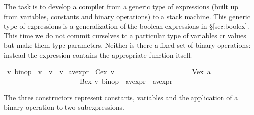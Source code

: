 %
\begin{isabellebody}%
%
%
\begin{isamarkuptext}%
\label{sec:ExprCompiler}
The task is to develop a compiler from a generic type of expressions (built
up from variables, constants and binary operations) to a stack machine.  This
generic type of expressions is a generalization of the boolean expressions in
\S\ref{sec:boolex}.  This time we do not commit ourselves to a particular
type of variables or values but make them type parameters.  Neither is there
a fixed set of binary operations: instead the expression contains the
appropriate function itself.%
\end{isamarkuptext}%
\ {\isacharprime}v\ binop\ {\isacharequal}\ {\isachardoublequote}{\isacharprime}v\ {\isasymRightarrow}\ {\isacharprime}v\ {\isasymRightarrow}\ {\isacharprime}v{\isachardoublequote}\isanewline
{}\ {\isacharparenleft}{\isacharprime}a{\isacharcomma}{\isacharprime}v{\isacharparenright}expr\ {\isacharequal}\ Cex\ {\isacharprime}v\isanewline
\ \ \ \ \ \ \ \ \ \ \ \ \ \ \ \ \ \ \ \ \ {\isacharbar}\ Vex\ {\isacharprime}a\isanewline
\ \ \ \ \ \ \ \ \ \ \ \ \ \ \ \ \ \ \ \ \ {\isacharbar}\ Bex\ {\isachardoublequote}{\isacharprime}v\ binop{\isachardoublequote}\ \ {\isachardoublequote}{\isacharparenleft}{\isacharprime}a{\isacharcomma}{\isacharprime}v{\isacharparenright}expr{\isachardoublequote}\ \ {\isachardoublequote}{\isacharparenleft}{\isacharprime}a{\isacharcomma}{\isacharprime}v{\isacharparenright}expr{\isachardoublequote}%
\begin{isamarkuptext}%
\noindent
The three constructors represent constants, variables and the application of
a binary operation to two subexpressions.


\end{isamarkuptext}
\end{isabellebody}
